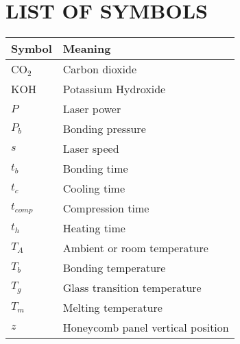\chapter*{\center\Huge{LIST OF SYMBOLS}}



\begin{center}
\begin{tabular}{ll}\hline
\textbf{Symbol} & \textbf{Meaning}\\\hline
CO$_2$ & Carbon dioxide\\
KOH& Potassium Hydroxide\\ 
$P$ & Laser power\\
$P_b$ & Bonding pressure\\
$s$ & Laser speed\\
$t_b$ & Bonding time\\
$t_c$ & Cooling time\\
$t_{comp}$ & Compression time\\
$t_h$ & Heating time\\
$T_A$ & Ambient or room temperature\\
$T_b$ & Bonding temperature\\
$T_g$ & Glass transition temperature\\
$T_m$ & Melting temperature\\
$z$ & Honeycomb panel vertical position\\
\hline
\end{tabular}
\end{center}
